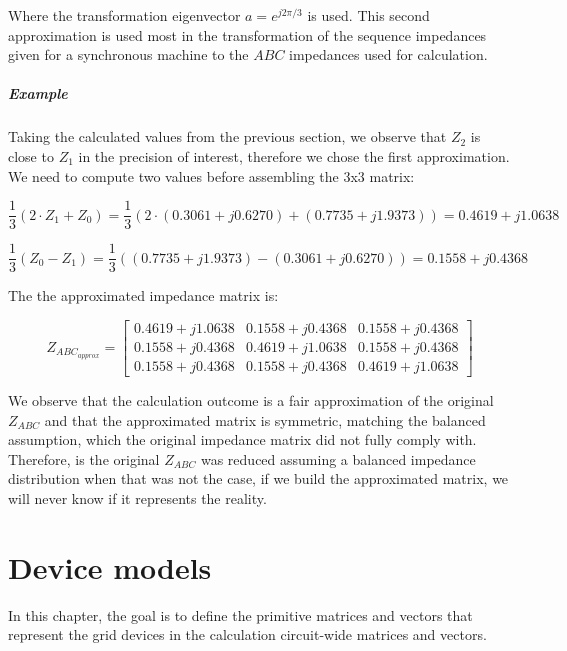 \documentclass[nols,a4paper,twoside,notoc,fleqn]{tufte-book}
\begin{document}
Where the transformation eigenvector $a=e^{j2 \pi / 3}$ is used. This second approximation is used most in the transformation of the sequence impedances given for a synchronous machine to the $ABC$ impedances used for calculation.

\paragraph{Example}
Taking the calculated values from the previous section, we observe that $Z_2$ is close to $Z_1$ in the precision of interest, therefore we chose the first approximation. We need to compute two values before assembling the 3x3 matrix:

$$
\frac{1}{3}(2 \cdot Z_1 + Z_0) = \frac{1}{3} (2\cdot(0.3061 + j 0.6270) + (0.7735 + j 1.9373)) = 0.4619 + j1.0638
$$

$$
\frac{1}{3} (Z_0 - Z_1) = \frac{1}{3}((0.7735 + j 1.9373) - (0.3061 + j 0.6270)) = 0.1558 + j0.4368
$$

The the approximated impedance matrix is:

$$
Z_{ABC_{approx}} = \left[ \begin{array}{ccc}
0.4619 + j1.0638 & 0.1558 + j0.4368 & 0.1558 + j0.4368 \\
0.1558 + j0.4368 & 0.4619 + j1.0638 & 0.1558 + j0.4368 \\ 
0.1558 + j0.4368 & 0.1558 + j0.4368 & 0.4619 + j1.0638
\end{array} \right]
$$

We observe that the calculation outcome is a fair approximation of the original $Z_{ABC}$ and that the approximated matrix is symmetric, matching the balanced assumption, which the original impedance matrix did not fully comply with. Therefore, is the original $Z_{ABC}$ was reduced assuming a balanced impedance distribution when that was not the case, if we build the approximated matrix, we will never know if it represents the reality.






\chapter{Device models} \label{devices}

In this chapter, the goal is to define the primitive matrices and vectors that represent the grid devices in the calculation circuit-wide matrices and vectors.
\end{document}
